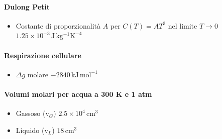 \documentclass[10pt, oneside]{book}
\begin{document}
\paragraph{Dulong Petit}
\begin{itemize}
\item Costante di proporzionalità $A$ per $C(T) = A T^3$ nel limite $T \rightarrow 0$ \dotfill $ 1.25 \times 10^{-3} \, \mathrm{J \, kg^{-1} K^{-4}}$ 
\end{itemize}
\paragraph{Respirazione cellulare}
\begin{itemize}
\item $\Delta g$ molare \dotfill $ -2840 \, \mathrm{kJ \, mol^{-1}}$
\end{itemize}
\paragraph{Volumi molari per acqua a 300 K e 1 atm}
\begin{itemize}
\item Gassoso ($\mathrm{v}_G$) \dotfill $ 2.5 \times 10^{4} \, \mathrm{cm^{3}}$
\item Liquido ($\mathrm{v}_L$) \dotfill $ 18 \, \mathrm{cm^{3}}$
\end{itemize}
\end{document}
